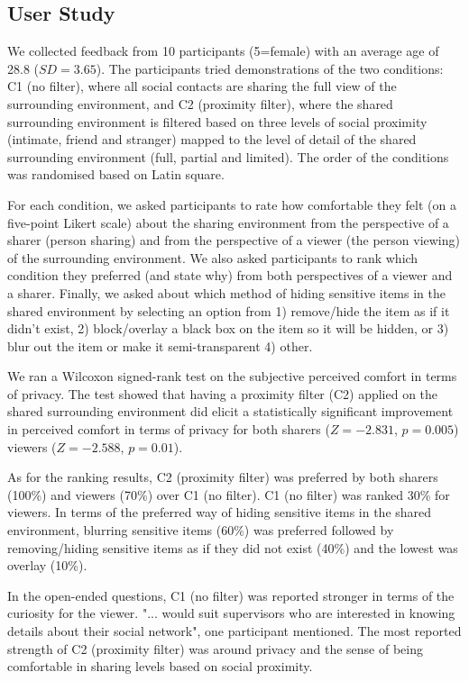 \subsection{User Study}

We collected feedback from 10 participants (5=female) with an average age of 28.8 ($SD=3.65$). The participants tried demonstrations of the two conditions: C1 (no filter), where all social contacts are sharing the full view of the surrounding environment, and C2 (proximity filter), where the shared surrounding environment is filtered based on three levels of social proximity (intimate, friend and stranger) mapped to the level of detail of the shared surrounding environment (full, partial and limited). The order of the conditions was randomised based on Latin square. 

For each condition, we asked participants to rate how comfortable they felt (on a five-point Likert scale) about the sharing environment from the perspective of a sharer (person sharing) and from the perspective of a viewer (the person viewing) of the surrounding environment. We also asked participants to rank which condition they preferred (and state why) from both perspectives of a viewer and a sharer. Finally, we asked about which method of hiding sensitive items in the shared environment by selecting an option from 1) remove/hide the item as if it didn't exist, 2) block/overlay a black box on the item so it will be hidden, or 3) blur out the item or make it semi-transparent 4) other. 

We ran a Wilcoxon signed-rank test on the subjective perceived comfort in terms of privacy. The test showed that having a proximity filter (C2) applied on the shared surrounding environment did elicit a statistically significant improvement in perceived comfort in terms of privacy for both sharers ($Z=-2.831$, $p=0.005$) viewers ($Z=-2.588$, $p=0.01$). 

As for the ranking results, C2 (proximity filter) was preferred by both sharers (100\%) and viewers (70\%) over C1 (no filter). C1 (no filter) was ranked 30\% for viewers. In terms of the preferred way of hiding sensitive items in the shared environment, blurring sensitive items (60\%) was preferred followed by removing/hiding sensitive items as if they did not exist (40\%) and the lowest was overlay (10\%). 

In the open-ended questions, C1 (no filter) was reported stronger in terms of the curiosity for the viewer. "... would suit supervisors who are interested in knowing details about their social network", one participant mentioned. The most reported strength of C2 (proximity filter) was around privacy and the sense of being comfortable in sharing levels based on social proximity. 


